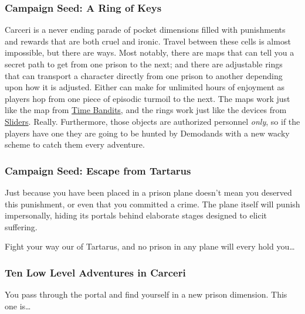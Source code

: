 \subsubsection{Campaign Seed: A Ring of Keys}

Carceri is a never ending parade of pocket dimensions filled with punishments and rewards that are both cruel and ironic. Travel between these cells is almost impossible, but there are ways. Most notably, there are maps that can tell you a secret path to get from one prison to the next; and there are adjustable rings that can transport a character directly from one prison to another depending upon how it is adjusted. Either can make for unlimited hours of enjoyment as players hop from one piece of episodic turmoil to the next. The maps work just like the map from \underline{Time Bandits}, and the rings work just like the devices from \underline{Sliders}. Really. Furthermore, those objects are authorized personnel \textit{only}, so if the players have one they are going to be hunted by Demodands with a new wacky scheme to catch them every adventure.

\subsubsection{Campaign Seed: Escape from Tartarus}

Just because you have been placed in a prison plane doesn't mean you deserved this punishment, or even that you committed a crime. The plane itself will punish impersonally, hiding its portals behind elaborate stages designed to elicit suffering.

Fight your way our of Tartarus, and no prison in any plane will every hold you\ldots

\subsubsection{Ten Low Level Adventures in Carceri}

You pass through the portal and find yourself in a new prison dimension. This one is\ldots

